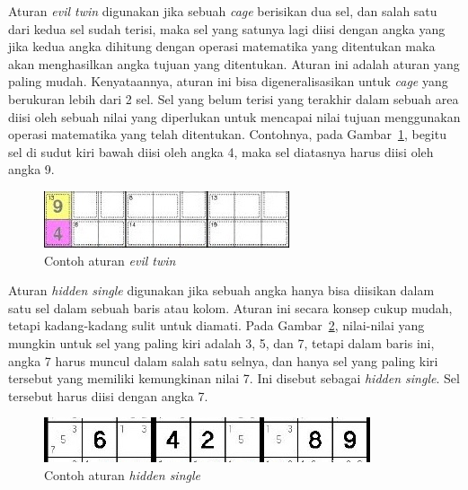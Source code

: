 Aturan \textit{evil twin} digunakan jika sebuah \textit{cage} berisikan dua sel, dan salah satu dari kedua sel sudah terisi, maka sel yang satunya lagi diisi dengan angka yang jika kedua angka dihitung dengan operasi matematika yang ditentukan maka akan menghasilkan angka tujuan yang ditentukan. Aturan ini adalah aturan yang paling mudah. Kenyataannya, aturan ini bisa digeneralisasikan untuk \textit{cage} yang berukuran lebih dari 2 sel. Sel yang belum terisi yang terakhir dalam sebuah area diisi oleh sebuah nilai yang diperlukan untuk mencapai nilai tujuan menggunakan operasi matematika yang telah ditentukan. Contohnya, pada Gambar~\ref{fig:hybrid3}, begitu sel di sudut kiri bawah diisi oleh angka 4, maka sel diatasnya harus diisi oleh angka 9.

\begin{figure}
\centering
\captionsetup{justification=centering}
\includegraphics[scale=0.9]{Gambar/HybridGenetic3}
\caption[Contoh aturan \textit{evil twin} ~\cite{johanna:12:hybrid}]{Contoh aturan \textit{evil twin} ~\cite{johanna:12:hybrid}}
\label{fig:hybrid3}
\end{figure}

Aturan \textit{hidden single} digunakan jika sebuah angka hanya bisa diisikan dalam satu sel dalam sebuah baris atau kolom. Aturan ini secara konsep cukup mudah, tetapi kadang-kadang sulit untuk diamati. Pada Gambar~\ref{fig:hybrid4}, nilai-nilai yang mungkin untuk sel yang paling kiri adalah 3, 5, dan 7, tetapi dalam baris ini, angka 7 harus muncul dalam salah satu selnya, dan hanya sel yang paling kiri tersebut yang memiliki kemungkinan nilai 7. Ini disebut sebagai \textit{hidden single}. Sel tersebut harus diisi dengan angka 7.

\begin{figure}
\centering
\captionsetup{justification=centering}
\includegraphics[scale=0.7]{Gambar/HybridGenetic4}
\caption[Contoh aturan \textit{hidden single} ~\cite{johanna:12:hybrid}]{Contoh aturan \textit{hidden single} ~\cite{johanna:12:hybrid}}
\label{fig:hybrid4}
\end{figure}

